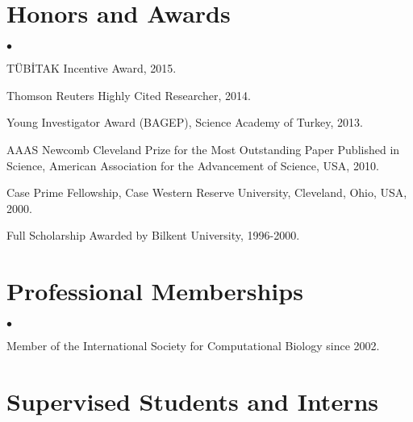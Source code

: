 \documentclass[margin,line]{res}
\newenvironment{list2}{
  \begin{list}{$\bullet$}{%
      \setlength{\itemsep}{0in}
      \setlength{\parsep}{0in} \setlength{\parskip}{0in}
      \setlength{\topsep}{0in} \setlength{\partopsep}{0in} 
      \setlength{\leftmargin}{0.2in}}}{\end{list}}
\newcommand{\junk}[1]{}
\begin{document}
\begin{resume}
          \section{\sc Honors and Awards} 
          \begin{list2}
            \junk{
            \item
              Ranked 36$^{th}$ among 1.2 million examinees in the Nationwide University
              Entrance Examinations in ~Turkey, 1996.
            \item
              Ranked 40$^{th}$ in the Nationwide Post-Graduate Education Examination in Turkey, 1999.
            }
          \item
            TÜBİTAK Incentive Award, 2015.
          \item
            Thomson Reuters Highly Cited Researcher, 2014.
          \item
            Young Investigator Award (BAGEP), Science Academy of Turkey, 2013.
          \item
            AAAS Newcomb Cleveland Prize for the Most Outstanding Paper Published in Science, American Association for the Advancement of Science, USA, 2010.
          \item
            Case Prime Fellowship, Case Western Reserve University, Cleveland, Ohio, USA, 2000.
          \item
            Full Scholarship Awarded by Bilkent University, 1996-2000.
          \end{list2}
          

\vspace*{-.2cm}
\section{\sc Professional Memberships}
\begin{list2}
\item 
  Member of the International Society for Computational Biology since 2002.
\end{list2}

\clearpage

\section{\sc Supervised Students and Interns}
\vspace*{-.4cm}

\end{resume}
\end{document}
